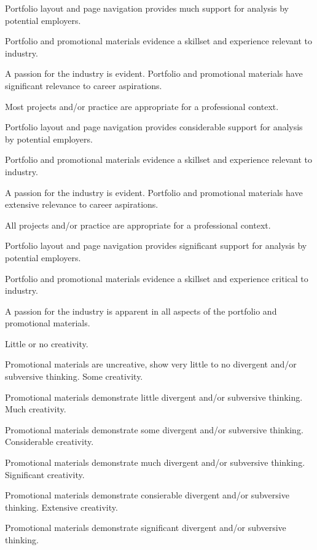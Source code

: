 \documentclass{../../fal_assignment}
\begin{document}
\begin{markingrubric}
        		\par 			Portfolio layout and page navigation provides much support for analysis by potential employers.
		\par			Portfolio and promotional materials evidence a skillset and experience relevant to industry.
		\par			A passion for the industry is evident.
        \grade 				Portfolio and promotional materials have significant relevance to career aspirations.
        		\par			Most projects and/or practice are appropriate for a professional context.
        		\par 			Portfolio layout and page navigation provides considerable support for analysis by potential employers.
		\par			Portfolio and promotional materials evidence a skillset and experience relevant to industry.
		\par			A passion for the industry is evident.
        \grade 				Portfolio and promotional materials have extensive relevance to career aspirations.	
      		\par 			All projects and/or practice are appropriate for a professional context.
        		\par 			Portfolio layout and page navigation provides significant support for analysis by potential employers.
		\par			Portfolio and promotional materials evidence a skillset and experience critical to industry.
		\par 			A passion for the industry is apparent in all aspects of the portfolio and promotional materials.
    
    
%
        \grade\fail Little or no creativity.
            \par Promotional materials are uncreative, show very little to no divergent and/or subversive thinking.
        \grade Some creativity.
            \par Promotional materials demonstrate little divergent and/or subversive thinking.
        \grade Much creativity.
            \par Promotional materials demonstrate some divergent and/or subversive thinking.
        \grade Considerable creativity.
            \par Promotional materials demonstrate much divergent and/or subversive thinking.
        \grade Significant creativity.
            \par Promotional materials demonstrate consierable divergent and/or subversive thinking.
        \grade Extensive creativity.
            \par Promotional materials demonstrate significant divergent and/or subversive thinking.
        
\end{markingrubric}
\end{document}
